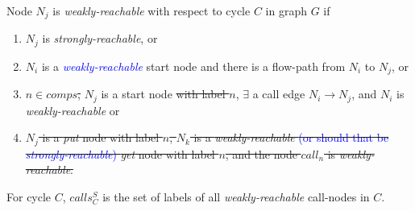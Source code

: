 \documentclass[12pt]{article}%
\newcommand{\Blue}[1] {\textcolor{blue}{#1}}%
\newcommand{\callsD}{\ensuremath{\mathit{calls_C^{S}}}\xspace}%
\begin{document}
\begin{definition}
\label{defn-wreachable}
Node $N_j$ is \emph{weakly-reachable} with respect to cycle $C$ in graph $G$ if
\begin{enumerate}
\item $N_j$ is \emph{strongly-reachable}, or
\item \label{wr-start} $N_i$ is a \Blue{\emph{weakly-reachable}} start node and there is a flow-path from $N_i$ to $N_j$, or

\item\label{wr-calledge} 
\sout{$n \in {comps}$,} $N_j$ is a start node \sout{with label $n$}, $\exists$ a call edge $N_i \rightarrow N_j$, and $N_i$ is \emph{weakly-reachable} or

\item \sout{$N_j$ is a \emph{put} node with label $n$,
$N_k$ is a 
\emph{weakly-reachable} \Blue{(or should that be \emph{strongly-reachable})}
\emph{get} node with label $n$, and the node $call_n$ is \emph{weakly-reachable}.}



\end{enumerate}
\end{definition}

\begin{definition}
\label{defn-calls}
For cycle $C$, \callsD %
is the set of labels of all \emph{weakly-reachable} call-nodes in $C$.
\end{definition}
\end{document}

